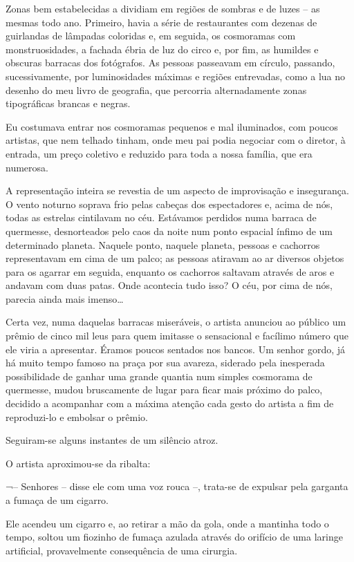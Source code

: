 Zonas bem estabelecidas a dividiam em regiões de sombras e de luzes -- as mesmas todo ano. Primeiro, havia a série de restaurantes com dezenas de guirlandas de lâmpadas coloridas e, em seguida, os cosmoramas com monstruosidades, a fachada ébria de luz do circo e, por fim, as humildes e obscuras barracas dos fotógrafos. As pessoas passeavam em círculo, passando, sucessivamente, por luminosidades máximas e regiões entrevadas, como a lua no desenho do meu livro de geografia, que percorria alternadamente zonas tipográficas brancas e negras.

Eu costumava entrar nos cosmoramas pequenos e mal iluminados, com poucos artistas, que nem telhado tinham, onde meu pai podia negociar com o diretor, à entrada, um preço coletivo e reduzido para toda a nossa família, que era numerosa.

A representação inteira se revestia de um aspecto de improvisação e insegurança. O vento noturno soprava frio pelas cabeças dos espectadores e, acima de nós, todas as estrelas cintilavam no céu. Estávamos perdidos numa barraca de quermesse, desnorteados pelo caos da noite num ponto espacial ínfimo de um determinado planeta. Naquele ponto, naquele planeta, pessoas e cachorros representavam em cima de um palco; as pessoas atiravam ao ar diversos objetos para os agarrar em seguida, enquanto os cachorros saltavam através de aros e andavam com duas patas. Onde acontecia tudo isso? O céu, por cima de nós, parecia ainda mais imenso\dots

Certa vez, numa daquelas barracas miseráveis, o artista anunciou ao público um prêmio de cinco mil leus para quem imitasse o sensacional e facílimo número que ele viria a apresentar. Éramos poucos sentados nos bancos. Um senhor gordo, já há muito tempo famoso na praça por sua avareza, siderado pela inesperada possibilidade de ganhar uma grande quantia num simples cosmorama de quermesse, mudou bruscamente de lugar para ficar mais próximo do palco, decidido a acompanhar com a máxima atenção cada gesto do artista a fim de reproduzi-lo e embolsar o prêmio.

Seguiram-se alguns instantes de um silêncio atroz.

O artista aproximou-se da ribalta: 

¬-- Senhores -- disse ele com uma voz rouca --, trata-se de expulsar pela garganta a fumaça de um cigarro. 

Ele acendeu um cigarro e, ao retirar a mão da gola, onde a mantinha todo o tempo, soltou um fiozinho de fumaça azulada através do orifício de uma laringe artificial, provavelmente consequência de uma cirurgia. 


